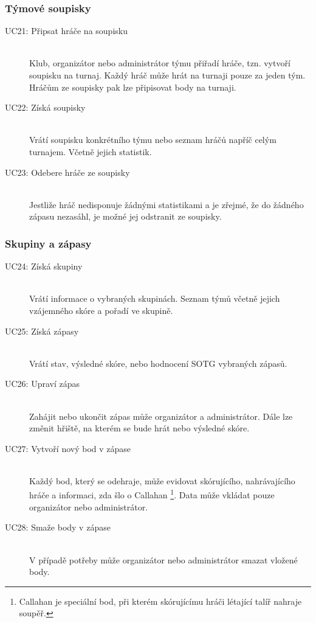   \subsubsection*{Týmové soupisky}
    \begin{description}
      \item[UC21: Připsat hráče na soupisku] \hfill \\
      Klub, organizátor nebo administrátor týmu přiřadí hráče, tzn. vytvoří soupisku na turnaj.
      Každý hráč může hrát na turnaji pouze za jeden tým. Hráčům ze soupisky pak lze připisovat body na turnaji.
      \item[UC22: Získá soupisky] \hfill \\
      Vrátí soupisku konkrétního týmu nebo seznam hráčů napříč celým turnajem. Včetně jejich statistik.
      \item[UC23: Odebere hráče ze soupisky] \hfill \\
      Jestliže hráč nedisponuje žádnými statistikami a je zřejmé, že do žádného zápasu nezasáhl, je možné jej odstranit ze soupisky.
    \end{description}
  
  \subsubsection*{Skupiny a zápasy}
    \begin{description}
      \item[UC24: Získá skupiny] \hfill \\
      Vrátí informace o vybraných skupinách. Seznam týmů včetně jejich vzájemného skóre a pořadí ve skupině.
      \item[UC25: Získá zápasy] \hfill \\
      Vrátí stav, výsledné skóre, nebo hodnocení SOTG vybraných zápasů.
      \item[UC26: Upraví zápas] \hfill \\
      Zahájit nebo ukončit zápas může organizátor a administrátor. Dále lze změnit hřiště, na kterém se bude hrát nebo výsledné skóre.
      \item[UC27: Vytvoří nový bod v zápase] \hfill \\
      Každý bod, který se odehraje, může evidovat skórujícího, nahrávajícího hráče a informaci, zda šlo o Callahan
      \footnote{Callahan je speciální bod, při kterém skórujícímu hráči létající talíř nahraje soupěř.}. Data může vkládat pouze organizátor nebo administrátor.
      \item[UC28: Smaže body v zápase] \hfill \\
      V případě potřeby může organizátor nebo administrátor smazat vložené body.
    \end{description}
    
